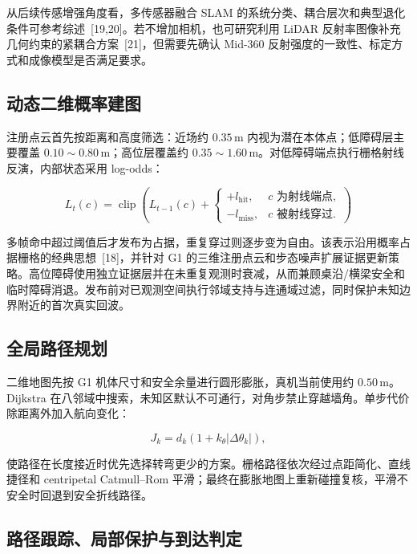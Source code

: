 \documentclass[11pt,a4paper,fontset=none]{ctexart}
\begin{document}
从后续传感增强角度看，多传感器融合 SLAM 的系统分类、耦合层次和典型退化条件可参考综述~[19,20]。若不增加相机，也可研究利用 LiDAR 反射率图像补充几何约束的紧耦合方案~[21]，但需要先确认 Mid-360 反射强度的一致性、标定方式和成像模型是否满足要求。

\subsection{动态二维概率建图}

注册点云首先按距离和高度筛选：近场约 $0.35\,$m 内视为潜在本体点；低障碍层主要覆盖 $0.10\sim0.80\,$m；高位层覆盖约 $0.35\sim1.60\,$m。对低障碍端点执行栅格射线反演，内部状态采用 log-odds：

\begin{equation}
L_t(c)=\operatorname{clip}\!\left(L_{t-1}(c)+
\begin{cases}
+l_{\mathrm{hit}}, & c\text{ 为射线端点},\\
-l_{\mathrm{miss}}, & c\text{ 被射线穿过}.
\end{cases}\right)
\end{equation}

多帧命中超过阈值后才发布为占据，重复穿过则逐步变为自由。该表示沿用概率占据栅格的经典思想~[18]，并针对 G1 的三维注册点云和步态噪声扩展证据更新策略。高位障碍使用独立证据层并在未重复观测时衰减，从而兼顾桌沿/横梁安全和临时障碍消退。发布前对已观测空间执行邻域支持与连通域过滤，同时保护未知边界附近的首次真实回波。

\subsection{全局路径规划}

二维地图先按 G1 机体尺寸和安全余量进行圆形膨胀，真机当前使用约 $0.50\,$m。Dijkstra 在八邻域中搜索，未知区默认不可通行，对角步禁止穿越墙角。单步代价除距离外加入航向变化：

\begin{equation}
J_{k}=d_k\left(1+k_{\theta}\left|\Delta\theta_k\right|\right),
\end{equation}

使路径在长度接近时优先选择转弯更少的方案。栅格路径依次经过点距简化、直线捷径和 centripetal Catmull--Rom 平滑；最终在膨胀地图上重新碰撞复核，平滑不安全时回退到安全折线路径。

\subsection{路径跟踪、局部保护与到达判定}
\end{document}
